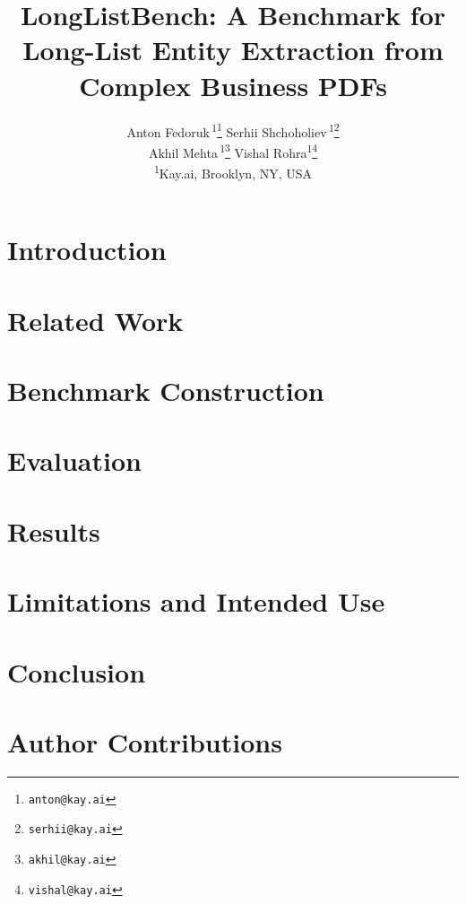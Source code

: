 \documentclass[12pt]{article}
\title{LongListBench: A Benchmark for Long-List Entity Extraction from Complex Business PDFs}
\author{
    Anton Fedoruk\,\orcidlink{0009-0004-0260-1704}\textsuperscript{1}\thanks{\texttt{anton@kay.ai}}
    \hspace{2em}
    Serhii Shchoholiev\,\orcidlink{0009-0007-2014-4828}\textsuperscript{1}\thanks{\texttt{serhii@kay.ai}}
    \\[0.5em]
    Akhil Mehta\,\orcidlink{0009-0001-0134-2905}\textsuperscript{1}\thanks{\texttt{akhil@kay.ai}}
    \hspace{2em}
    Vishal Rohra\textsuperscript{1}\thanks{\texttt{vishal@kay.ai}}
    \\[1em]
    \normalsize\textsuperscript{1}Kay.ai, Brooklyn, NY, USA
}
\date{}
\theoremstyle{definition}
\theoremstyle{remark}
\begin{document}
\maketitle

\begin{abstract}

\end{abstract}

\section{Introduction}
\label{sec:introduction}


\section{Related Work}
\label{sec:related-work}


\section{Benchmark Construction}
\label{sec:benchmark-construction}


\section{Evaluation}
\label{sec:evaluation}


\section{Results}
\label{sec:results}


\section{Limitations and Intended Use}
\label{sec:limitations}


\section{Conclusion}
\label{sec:conclusion}


\section*{Author Contributions}
{\small
}

% 

\printbibliography

\newpage

\end{document}
